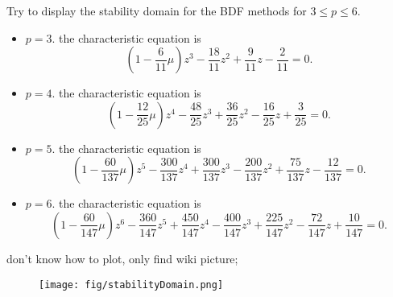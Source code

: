 \exc Try to display the stability domain 
for the BDF methods for $3\leq p \leq 6$.

\begin{solution}
\begin{itemize}
  \item $p = 3$. the characteristic equation is 
  \[(1 - \frac{6}{11} \mu) z^3 - \frac{18}{11} z ^2 
   + \frac{9}{11} z - \frac{2}{11} = 0. \]

   \item $p = 4$. the characteristic equation is 
  \[(1 - \frac{12}{25} \mu) z^4 - \frac{48}{25} z ^3 
   + \frac{36}{25} z^2 - \frac{16}{25} z 
   + \frac{3}{25} = 0. \]

   \item $p = 5$. the characteristic equation is 
   \[(1 - \frac{60}{137} \mu) z^5 - \frac{300}{137} z ^4 
   + \frac{300}{137} z^3 - \frac{200}{137} z^2 
   + \frac{75}{137} z - \frac{12}{137} = 0. \]

   \item $p = 6$. the characteristic equation is 
   \[(1 - \frac{60}{147} \mu) z^6 - \frac{360}{147} z ^5 
  + \frac{450}{147} z^4 - \frac{400}{147} z^3 
  + \frac{225}{147} z^2 - \frac{72}{147} z 
  + \frac{10}{147} = 0. \]
\end{itemize}

don't know how to plot, only find wiki picture;
\begin{figure}[!h]
  \caption{}
  \centering
  \texttt{[image: fig/stabilityDomain.png]}
 
\end{figure}
\end{solution}

